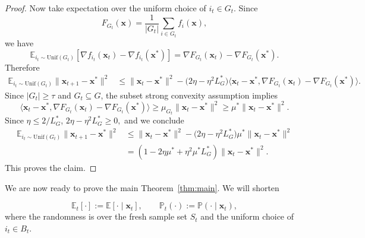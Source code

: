 \documentclass[11pt]{article}
\newcommand{\ve}[1]{\mathbf{#1}}
\begin{document}
\begin{proof}
Now take expectation over the uniform choice of $i_t\in G_t$. Since
\[
F_{G_t}(\ve{x})
=
\frac{1}{|G_t|}\sum_{i\in G_t}f_i(\ve{x}),
\]
we have
\[
\mathbb{E}_{i_t\sim\mathrm{Unif}(G_t)}
\left[
\nabla f_{i_t}(\ve{x}_t)-\nabla f_{i_t}(\ve{x}^*)
\right]
=
\nabla F_{G_t}(\ve{x}_t)-\nabla F_{G_t}(\ve{x}^*).
\]
Therefore
\begin{align*}
\mathbb{E}_{i_t\sim\mathrm{Unif}(G_t)}
\|\ve{x}_{t+1}-\ve{x}^*\|^2
&\le
\|\ve{x}_t-\ve{x}^*\|^2 -
\bigl(2\eta-\eta^2L_{G}^*\bigr)
\bigl\langle
\ve{x}_t-\ve{x}^*,
\nabla F_{G_t}(\ve{x}_t)-\nabla F_{G_t}(\ve{x}^*)
\bigr\rangle.
\end{align*}
Since $|G_t|\ge \tau$ and $G_t\subseteq G$, the subset strong convexity
assumption implies
\[
\bigl\langle
\ve{x}_t-\ve{x}^*,
\nabla F_{G_t}(\ve{x}_t)-\nabla F_{G_t}(\ve{x}^*)
\bigr\rangle
\ge
\mu_{G_t}\|\ve{x}_t-\ve{x}^*\|^2
\ge
\mu^*\|\ve{x}_t-\ve{x}^*\|^2.
\]
Since $\eta\le 2/L_{G}^*$,
$2\eta-\eta^2L_{G}^*\ge 0,$
and we conclude
\begin{align*}
\mathbb{E}_{i_t\sim\mathrm{Unif}(G_t)}
\|\ve{x}_{t+1}-\ve{x}^*\|^2
&\le
\|\ve{x}_t-\ve{x}^*\|^2
-
\bigl(2\eta-\eta^2L_{G}^*\bigr)\mu^*
\|\ve{x}_t-\ve{x}^*\|^2 \\
&=
\left(
1-2\eta\mu^*
+\eta^2\mu^*L_{G}^*
\right)
\|\ve{x}_t-\ve{x}^*\|^2.
\end{align*}
This proves the claim.
\end{proof}


We are now ready to prove the main Theorem~\ref{thm:main}. We will shorten

\[
\mathbb{E}_t[\cdot]
:=
\mathbb{E}[\cdot\mid \ve{x}_t],
\qquad
\mathbb{P}_t(\cdot)
:=
\mathbb{P}(\cdot\mid \ve{x}_t),
\]
where the randomness is over the fresh sample set $S_t$ and the uniform choice
of $i_t\in B_t$.
\end{document}

